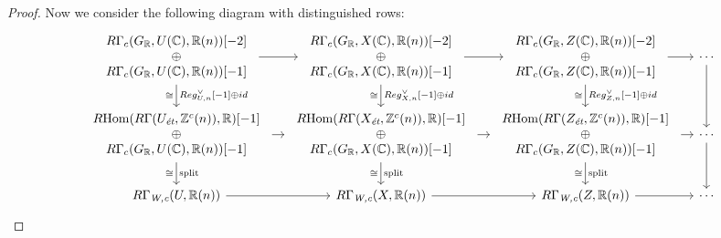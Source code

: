 \documentclass{article}
\numberwithin{equation}{section}
\begin{document}
\begin{lemma}
\begin{proof}
    Now we consider the following diagram with distinguished rows:
    \[ \begin{tikzcd}[column sep=1em]
        \begin{array}{c} R\Gamma_c (G_\RR, U (\CC), \RR (n)) [-2] \\ \oplus \\ R\Gamma_c (G_\RR, U (\CC), \RR (n)) [-1] \end{array} \ar{d}{Reg_{U,n}^\vee [-1] \oplus id}[swap]{\cong} \ar{r} & \begin{array}{c} R\Gamma_c (G_\RR, X (\CC), \RR (n)) [-2] \\ \oplus \\ R\Gamma_c (G_\RR, X (\CC), \RR (n)) [-1] \end{array} \ar{d}{Reg_{X,n}^\vee [-1] \oplus id}[swap]{\cong} \ar{r} & \begin{array}{c} R\Gamma_c (G_\RR, Z (\CC), \RR (n)) [-2] \\ \oplus \\ R\Gamma_c (G_\RR, Z (\CC), \RR (n)) [-1] \end{array} \ar{d}{Reg_{Z,n}^\vee [-1] \oplus id}[swap]{\cong} \ar{r} & \cdots \ar{d} \\
        \begin{array}{c} \RHom (R\Gamma (U_\et, \ZZ^c (n)), \RR) [-1] \\ \oplus \\ R\Gamma_c (G_\RR, U (\CC), \RR (n)) [-1] \end{array} \ar{d}{\text{split}}[swap]{\cong} \ar{r} & \begin{array}{c} \RHom (R\Gamma (X_\et, \ZZ^c (n)), \RR) [-1] \\ \oplus \\ R\Gamma_c (G_\RR, X (\CC), \RR (n)) [-1] \end{array} \ar{d}{\text{split}}[swap]{\cong} \ar{r} & \begin{array}{c} \RHom (R\Gamma (Z_\et, \ZZ^c (n)), \RR) [-1] \\ \oplus \\ R\Gamma_c (G_\RR, Z (\CC), \RR (n)) [-1] \end{array} \ar{d}{\text{split}}[swap]{\cong} \ar{r} & \cdots \ar{d} \\
        R\Gamma_\Wc (U, \RR (n)) \ar{r} & R\Gamma_\Wc (X, \RR (n)) \ar{r} & R\Gamma_\Wc (Z, \RR (n)) \ar{r} & \cdots
      \end{tikzcd} \]


\end{proof}
\end{lemma}
\end{document}
